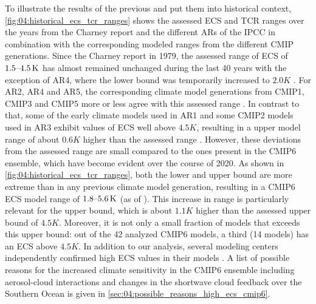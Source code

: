 To illustrate the results of the previous
 and put them into historical context,
\cref{fig:04:historical_ecs_tcr_ranges} shows the assessed \ac{ECS} and
\ac{TCR} ranges over the years from the Charney report \autocite{Charney1979}
and the different \acp{AR} of the \ac{IPCC} in combination with the
corresponding modeled ranges from the different \ac{CMIP} generations. Since
the Charney report in 1979, the assessed range of \ac{ECS} of
$\rangeunit{1.5}{4.5}{K}$ has almost remained unchanged during the last 40
years \autocite{Charney1979, Mitchell1990, Kattenberg1996, Albritton2001,
  Stocker2013} with the exception of \acs{AR}4, where the lower bound was
temporarily increased to $2.0 \unit{K}$ \autocite{Solomon2007}. For \acs{AR}2,
\acs{AR}4 and \acs{AR}5, the corresponding climate model generations from
\acs{CMIP}1, \acs{CMIP}3 and \acs{CMIP}5 more or less agree with this assessed
range \autocite{Kattenberg1996, Randall2007, Flato2013}. In contrast to that,
some of the early climate models used in \acs{AR}1 and some \acs{CMIP}2 models
used in \acs{AR}3 exhibit values of \acs{ECS} well above $4.5 \unit{K}$,
resulting in a upper model range of about $0.6 \unit{K}$ higher than the
assessed range \autocite{Mitchell1990, Cubasch2001}. However, these deviations
from the assessed range are small compared to the ones present in the
\acs{CMIP}6 ensemble, which have become evident over the course of 2020. As
shown in \cref{fig:04:historical_ecs_tcr_ranges}, both the lower and upper
bound are more extreme than in any previous climate model generation, resulting
in a \acs{CMIP}6 \ac{ECS} model range of $\rangeunit{1.8}{5.6}{K}$ (as of
\TheMonth{}). This increase in range is particularly relevant for the upper
bound, which is about $1.1 \unit{K}$ higher than the assessed upper bound of
$4.5 \unit{K}$. Moreover, it is not only a small fraction of models that
exceeds this upper bound: out of the 42 analyzed \acs{CMIP}6 models, a third
(14 models) has an \ac{ECS} above $4.5 \unit{K}$. In addition to our analysis,
several modeling centers independently confirmed high \ac{ECS} values in their
models \autocite{Andrews2019, Gettelman2019, Wyser2020}. A list of possible
reasons for the increased climate sensitivity in the \acs{CMIP}6 ensemble
including aerosol-cloud interactions and changes in the shortwave cloud
feedback over the Southern Ocean is given in
\cref{sec:04:possible_reasons_high_ecs_cmip6}.

